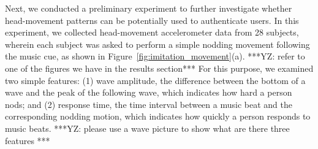 Next, we conducted a preliminary experiment to further investigate whether head-movement patterns can be potentially used to authenticate users. In this experiment, we collected head-movement accelerometer data from 28 subjects, wherein each subject was asked to perform a simple nodding movement following the music cue, as shown in Figure~\ref{fig:imitation_movement}(a). ***YZ: refer to one of the figures we have in the results section***  For this purpose, we examined two simple features: (1) wave amplitude, the difference between the bottom of a wave and the peak of the following wave, which indicates how hard a person nods; %
and (2) response time, the time interval between a music beat and the corresponding nodding motion, which indicates how quickly a person responds to music beats. ***YZ: please use a wave picture to show what are there three features ***
